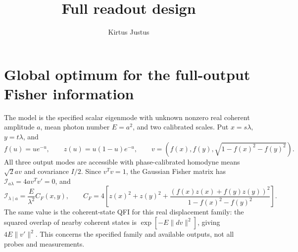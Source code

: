 \documentclass[10pt,a4paper]{article}
\title{Full readout design}\author{Kirtus Justus}\date{}
\begin{document}
\maketitle
\section{Global optimum for the full-output Fisher information}
The model is the specified scalar eigenmode with unknown nonzero real coherent amplitude $a$, mean photon number $E=a^2$, and two calibrated scales. Put $x=s\lambda$, $y=t\lambda$, and
\[
f(u)=ue^{-u},\qquad z(u)=u(1-u)e^{-u},\qquad
v=(f(x),f(y),\sqrt{1-f(x)^2-f(y)^2}).
\]
All three output modes are accessible with phase-calibrated homodyne means $\sqrt2 a v$ and covariance $I/2$. Since $v^Tv=1$, the Gaussian Fisher matrix has $\mathcal I_{a\lambda}=4a v^Tv'=0$, and
\[
\mathcal I_{\lambda\mid a}=\frac E{\lambda^2}C_F(x,y),\qquad
C_F=4\left[z(x)^2+z(y)^2+
\frac{(f(x)z(x)+f(y)z(y))^2}{1-f(x)^2-f(y)^2}\right].
\]
The same value is the coherent-state QFI for this real displacement family: the squared overlap of nearby coherent states is $\exp[-E\|dv\|^2]$, giving $4E\|v'\|^2$. This concerns the specified family and available outputs, not all probes and measurements.
\end{document}
